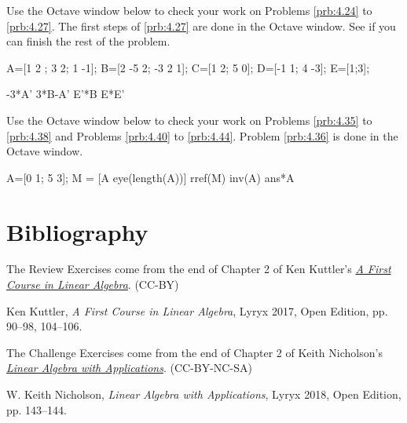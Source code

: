 \documentclass{ximera}
\begin{document}
\begin{problem}\label{oct:matr_ops}
Use the Octave window below to check your work on Problems \ref{prb:4.24} to \ref{prb:4.27}.  The first steps of \ref{prb:4.27} are done in the Octave window.  See if you can finish the rest of the problem.

A=[1 2 ; 3 2; 1 -1];
B=[2 -5 2; -3 2 1];
C=[1 2; 5 0];
D=[-1 1; 4 -3];
E=[1;3];

-3*A'
3*B-A'
E'*B
E*E'

\end{problem}

\begin{problem}\label{oct:matr_inv}
Use the Octave window below to check your work on Problems \ref{prb:4.35} to \ref{prb:4.38} and Problems \ref{prb:4.40} to \ref{prb:4.44}.  Problem \ref{prb:4.36} is done in the Octave window.  

A=[0 1; 5 3];
M = [A eye(length(A))]
rref(M)
inv(A)
ans*A
\end{problem}


\section*{Bibliography}
The Review Exercises come from the end of Chapter 2 of Ken Kuttler's \href{https://open.umn.edu/opentextbooks/textbooks/a-first-course-in-linear-algebra-2017}{\it A First Course in Linear Algebra}. (CC-BY)

Ken Kuttler, {\it  A First Course in Linear Algebra}, Lyryx 2017, Open Edition, pp. 90--98, 104--106.  

The Challenge Exercises come from the end of Chapter 2 of Keith Nicholson's \href{https://open.umn.edu/opentextbooks/textbooks/linear-algebra-with-applications}{\it Linear Algebra with Applications}. (CC-BY-NC-SA)

W. Keith Nicholson, {\it Linear Algebra with Applications}, Lyryx 2018, Open Edition, pp. 143--144. 
\end{document}
